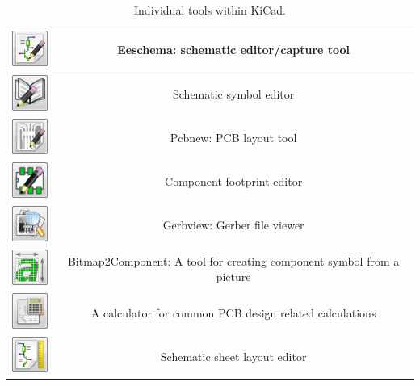\documentclass[12pt,letterpaper]{scrartcl}
\begin{document}
\begin{table}
\caption{Individual tools within KiCad.}
\begin{tabular}{|c|c|}
\hline \includegraphics[width=0.5in]{eeschema-icon}  &   Eeschema: schematic editor/capture tool\\ 
\hline \includegraphics[width=0.5in]{sche-lib-icon} &  Schematic symbol editor\\ 
\hline \includegraphics[width=0.5in]{pcbnew-icon} &  Pcbnew: PCB layout tool\\ 
\hline \includegraphics[width=0.5in]{footprint-lib-icon} &  Component footprint editor\\ 
\hline \includegraphics[width=0.5in]{gerbview-icon} &  Gerbview: Gerber file viewer\\ 
\hline \includegraphics[width=0.5in]{bitmap2component-icon} &  Bitmap2Component: A tool for creating component symbol from a picture\\ 
\hline \includegraphics[width=0.5in]{calculator-icon} &  A calculator for common PCB design related calculations \\ 
\hline \includegraphics[width=0.5in]{pi-editor-icon} &  Schematic sheet layout editor\\ 
\hline 
\end{tabular} 
\end{table}
\end{document}
